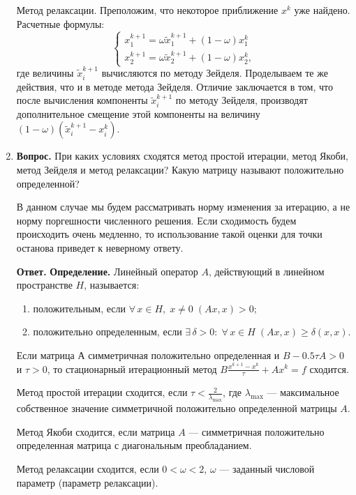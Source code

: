 \documentclass[12pt, a4paper]{article}
\begin{document}
\begin{enumerate}
	Метод релаксации.  Преположим, что некоторое приближение $x^k$ уже найдено.
	Расчетные формулы: 
	\[
	\begin{cases}
		x_1^{k+1} = \omega \tilde{x}_1^{k+1} + (1-\omega)x_1^k\\
		x_2^{k+1} =  \omega \tilde{x}_2^{k+1} + (1-\omega)x_2^k,
	\end{cases} 
	\]
	где величины $\tilde{x}_i^{k+1}$ вычисляются по методу Зейделя. Проделываем те же действия, что и в методе метода Зейделя. Отличие заключается в том, что после вычисления компоненты $\tilde{x}_i^{k+1}$ по методу Зейделя, производят
	дополнительное смещение этой компоненты на величину $(1-\omega)(\tilde{x}_i^{k+1}-x_i^{k})$.
	
	\item  \textbf{Вопрос.} При каких условиях сходятся метод простой итерации, метод Якоби, метод Зейделя и метод релаксации? Какую матрицу называют положительно определенной?
	
	В данном случае мы будем рассматривать норму изменения за итерацию, а не норму поргешности численного решения. Если сходимость будем происходить очень медленно, то использование такой оценки для точки останова приведет к неверному ответу.
	
	\textbf{Ответ.}
	 \textbf{Определение.} Линейный оператор $ A $, действующий в линейном пространстве $ H $, называется:
	\begin{enumerate}
		\item положительным, если $ \forall \, x \in H, \; x \ne 0 \; (Ax,x) > 0; $
		\item положительно определенным, если $ \exists \, \delta > 0: \; \forall \, x \in H \; (Ax,x) \geq \delta (x,x)$.
	\end{enumerate}
\medskip

Если матрица $ А $ симметричная положительно определенная и $ B - 0.5\tau A > 0$ и $\tau > 0 $, то стационарный итерационный метод $ B \frac{x^{k + 1} - x^k}{\tau}+A x^k = f $ сходится.

Метод простой итерации сходится, если $ \tau < \frac{2}{\lambda_{\text{max}}} $, где $\lambda_{\text{max}}$ --- максимальное собственное значение симметричной положительно определенной матрицы $A$.

 Метод Якоби сходится, если матрица $A$ --- симметричная положительно определенная матрица с диагональным преобладанием.
 
 Метод релаксации сходится, если $ 0 < \omega < 2 $, $\omega$ --- заданный числовой параметр (параметр релаксации).
 

\end{enumerate}
\end{document}

